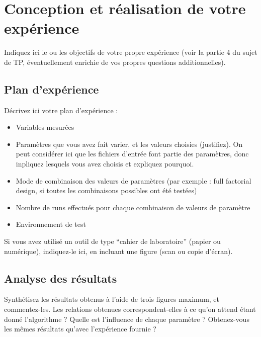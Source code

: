 
\section{Conception et réalisation de votre expérience}
Indiquez ici le ou les objectifs de votre propre expérience (voir la partie 4 du sujet de TP, éventuellement enrichie de vos propres questions additionnelles).

\subsection{Plan d'expérience}
Décrivez ici votre plan d'expérience :
\begin{itemize}
	\item Variables mesurées
	\item Paramètres que vous avez fait varier, et les valeurs choisies (justifiez). On peut considérer ici que les fichiers d'entrée font partie des paramètres, donc inpliquez lesquels vous avez choisis et expliquez pourquoi.
	\item Mode de combinaison des valeurs de paramètres (par exemple : full factorial design, si toutes les combinaisons possibles ont été testées)
	\item Nombre de runs effectués pour chaque combinaison de valeurs de paramètre
	\item Environnement de test
\end{itemize}

Si vous avez utilisé un outil de type ``cahier de laboratoire'' (papier ou numérique), indiquez-le ici, en incluant une figure (scan ou copie d'écran).

\subsection{Analyse des résultats}
Synthétisez les résultats obtenus à l'aide de trois figures maximum, et commentez-les. Les relations obtenues correspondent-elles à ce qu'on attend étant donné l'algorithme ? Quelle est l'influence de chaque paramètre ? Obtenez-vous les mêmes résultats qu'avec l'expérience fournie ?
